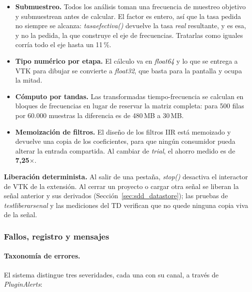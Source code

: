 \documentclass[12pt,letterpaper,oneside]{article}
\DeclareRobustCommand{\_}{\textunderscore\allowbreak}
\begin{document}
\begin{itemize}
    \item \textbf{Submuestreo.} Todos los análisis toman una frecuencia de muestreo objetivo y submuestrean antes de calcular. El factor es entero, así que la tasa pedida no siempre se alcanza: \textit{tasa\_efectiva()} devuelve la tasa \textit{real} resultante, y es esa, y no la pedida, la que construye el eje de frecuencias. Tratarlas como iguales corría todo el eje hasta un 11\,\%.
    \item \textbf{Tipo numérico por etapa.} El cálculo va en \textit{float64} y lo que se entrega a VTK para dibujar se convierte a \textit{float32}, que basta para la pantalla y ocupa la mitad.
    \item \textbf{Cómputo por tandas.} Las transformadas tiempo-frecuencia se calculan en bloques de frecuencias en lugar de reservar la matriz completa: para 500 filas por 60.000 muestras la diferencia es de 480\,MB a 30\,MB.
    \item \textbf{Memoización de filtros.} El diseño de los filtros IIR está memoizado y devuelve una copia de los coeficientes, para que ningún consumidor pueda alterar la entrada compartida. Al cambiar de \textit{trial}, el ahorro medido es de \textbf{7,25$\times$}.
\end{itemize}

\textbf{Liberación determinista.} Al salir de una pestaña, \textit{stop()} desactiva el interactor de VTK de la extensión. Al cerrar un proyecto o cargar otra señal se liberan la señal anterior y sus derivados (Sección~\ref{sec:sdd_datastore}); las pruebas de \textit{test\_liberar\_senal} y las mediciones del TD verifican que no quede ninguna copia viva de la señal.

\subsubsection{Fallos, registro y mensajes}

\paragraph{Taxonomía de errores.} El sistema distingue tres severidades, cada una con su canal, a través de \textit{PluginAlerts}:
\end{document}
